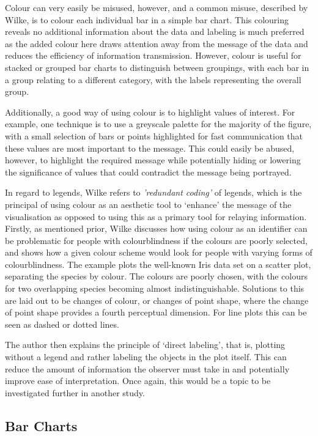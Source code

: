 \documentclass[
  11pt,
]{book}
\begin{document}
Colour can very easily be misused, however, and a common misuse,
described by Wilke, is to colour each individual bar in a simple bar
chart. This colouring reveals no additional information about the data
and labeling is much preferred as the added colour here draws attention
away from the message of the data and reduces the efficiency of
information transmission. However, colour is useful for stacked or
grouped bar charts to distinguish between groupings, with each bar in a
group relating to a different category, with the labels representing the
overall group.

Additionally, a good way of using colour is to highlight values of
interest. For example, one technique is to use a greyscale palette for
the majority of the figure, with a small selection of bars or points
highlighted for fast communication that these values are most important
to the message. This could easily be abused, however, to highlight the
required message while potentially hiding or lowering the significance
of values that could contradict the message being portrayed.

In regard to legends, Wilke refers to \textit{'redundant coding'} of
legends, which is the principal of using colour as an aesthetic tool to
`enhance' the message of the visualisation as opposed to using this as a
primary tool for relaying information. Firstly, as mentioned prior,
Wilke discusses how using colour as an identifier can be problematic for
people with colourblindness if the colours are poorly selected, and
shows how a given colour scheme would look for people with varying forms
of colourblindness. The example plots the well-known Iris data set on a
scatter plot, separating the species by colour. The colours are poorly
chosen, with the colours for two overlapping species becoming almost
indistinguishable. Solutions to this are laid out to be changes of
colour, or changes of point shape, where the change of point shape
provides a fourth perceptual dimension. For line plots this can be seen
as dashed or dotted lines.

The author then explains the principle of `direct labeling', that is,
plotting without a legend and rather labeling the objects in the plot
itself. This can reduce the amount of information the observer must take
in and potentially improve ease of interpretation. Once again, this
would be a topic to be investigated further in another study.

\subsection{Bar Charts}
\end{document}
